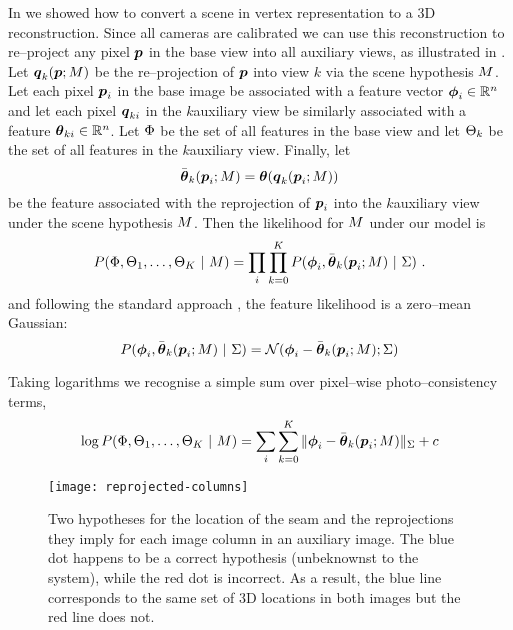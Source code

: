 In  we showed how to convert a scene in vertex
representation to a 3D reconstruction. Since all cameras are
calibrated we can use this reconstruction to re--project any pixel
$\Pixel$ in the base view into all auxiliary views, as illustrated in
. Let $\AuxPixel_k(\Pixel;\Scene)$ be the
re--projection of $\Pixel$ into view $k$ via the scene hypothesis
$\Scene$. Let each pixel $\Pixel_i$ in the base image be associated
with a feature vector $\Feature_i\in\Reals^n$ and let each pixel
$\AuxPixel_{ki}$ in the $k$\th auxiliary view be similarly associated
with a feature $\AuxFeature_{ki}\in\Reals^n$. Let $\Features$ be the
set of all features in the base view and let $\AuxFeatures_k$ be the
set of all features in the $k$\th auxiliary view. Finally, let
\begin{equation}
  \ComputedAuxFeature_k(\Pixel_i;\Scene) =
  \AuxFeature(\AuxPixel_k(\Pixel_i;\Scene))
\end{equation}
be the feature associated with the reprojection of $\Pixel_i$ into the
$k$\th auxiliary view under the scene hypothesis $\Scene$. Then the
likelihood for $\Scene$ under our model is
\begin{equation}
  P(\Features,\AuxFeatures_1,\ldots,\AuxFeatures_K ~|~ \Scene) =
    \prod_i \prod_{k=0}^{\NumViews} 
      P(\Feature_i, \ComputedAuxFeature_k(\Pixel_i;\Scene) ~|~
      \StereoCov)~.
  \label{eq:stereo-likelihood}
\end{equation}
and following the standard approach \cite{Scharstein01}, the feature
likelihood is a zero--mean Gaussian:
\begin{equation}
  P(\Feature_i, \ComputedAuxFeature_k(\Pixel_i;\Scene) ~|~ \StereoCov)
   = \NormalDistr(\Feature_i-\ComputedAuxFeature_k(\Pixel_i;\Scene); \StereoCov)
\end{equation}

Taking logarithms we recognise a simple sum over pixel--wise
photo--consistency terms,
\begin{equation}
  \label{eq:stereo-loglik}
  \log P(\Features,\AuxFeatures_1,\ldots,\AuxFeatures_{\NumViews}
            ~|~ \Scene) =
  \sum_i \sum_{k=0}^{\NumViews} 
    \|\Feature_i-\ComputedAuxFeature_k(\Pixel_i;\Scene)\|_{\StereoCov}
   +c
\end{equation}

\begin{figure}[tb]
  \centering \texttt{[image: reprojected-columns]}
  \caption{Two hypotheses for the location of the seam and the
    reprojections they imply for each image column in an auxiliary
    image. The blue dot happens to be a correct hypothesis (unbeknownst
    to the system), while the red dot is incorrect. As a result, the
    blue line corresponds to the same set of 3D locations in both
    images but the red line does not.}
  \label{fig:reprojected-columns}
\end{figure}

